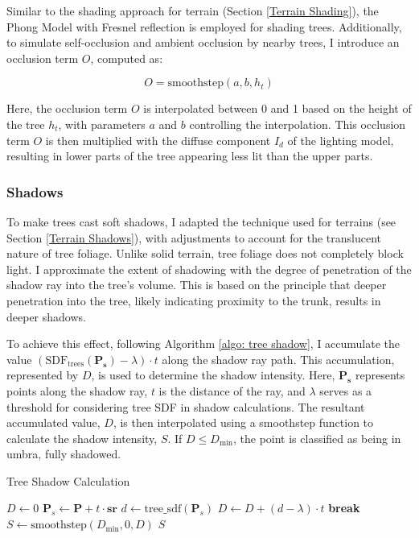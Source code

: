 Similar to the shading approach for terrain (Section \ref{Terrain Shading}), the Phong Model with Fresnel reflection is employed for shading trees. Additionally, to simulate self-occlusion and ambient occlusion by nearby trees, I introduce an occlusion term $O$, computed as:

\begin{equation}
O = \text{smoothstep}(a, b, h_t)
\end{equation}

Here, the occlusion term $O$ is interpolated between 0 and 1 based on the height of the tree $h_t$, with parameters $a$ and $b$ controlling the interpolation. This occlusion term $O$ is then multiplied with the diffuse component $I_d$ of the lighting model, resulting in lower parts of the tree appearing less lit than the upper parts.

\subsubsection{Shadows}

To make trees cast soft shadows, I adapted the technique used for terrains (see Section \ref{Terrain Shadows}), with adjustments to account for the translucent nature of tree foliage. Unlike solid terrain, tree foliage does not completely block light. I approximate the extent of shadowing with the degree of penetration of the shadow ray into the tree's volume. This is based on the principle that deeper penetration into the tree, likely indicating proximity to the trunk, results in deeper shadows.

To achieve this effect, following Algorithm \ref{algo: tree shadow}, I accumulate the value $(\text{SDF}_{\text{trees}}(\mathbf{P_s}) - \lambda) \cdot t$ along the shadow ray path. This accumulation, represented by $D$, is used to determine the shadow intensity. Here, $\mathbf{P_s}$ represents points along the shadow ray, $t$ is the distance of the ray, and $\lambda$ serves as a threshold for considering tree SDF in shadow calculations. The resultant accumulated value, $D$, is then interpolated using a smoothstep function to calculate the shadow intensity, $S$. If $D \le D_{\text{min}}$, the point is classified as being in umbra, fully shadowed.

\begin{algorithm}
\caption{Tree Shadow Calculation}
\label{algo: tree shadow}
\begin{algorithmic}
    \State $D \gets 0$
        \State $\mathbf{P}_s \gets \mathbf{P} + t \cdot \mathbf{sr}$
        \State $d \gets \text{tree\_sdf}(\mathbf{P}_s)$
            \State $D \gets D + (d - \lambda) \cdot t$
        \EndIf
            \State \textbf{break}
        \EndIf
    \EndFor
    \State $S \gets \text{smoothstep}(D_{\text{min}}, 0, D)$
    \State \Return $S$
\EndFunction
\end{algorithmic}
\end{algorithm}

